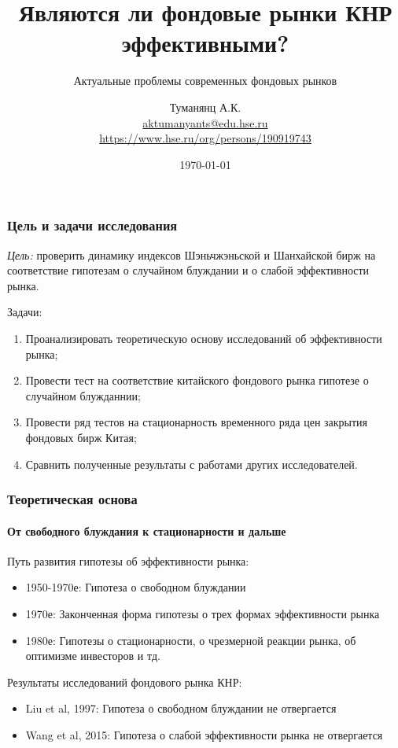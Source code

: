 \documentclass{beamer}
\title[Являются ли фондовые рынки КНР эффективными?]{Являются ли фондовые рынки КНР эффективными?}
\subtitle{Актуальные проблемы современных фондовых рынков}
\author[Туманянц А.К.]{Туманянц А.К. \\ \smallskip \scriptsize \url{aktumanyants@edu.hse.ru}\\\url{https://www.hse.ru/org/persons/190919743}}
\institute[Высшая школа экономики]{Национальный исследовательский университет \\ «Высшая школа экономики» (Москва)}
\date{\today}
\begin{document}

\frame[plain]{\titlepage}	%

\section{}
\subsection{}

\begin{frame}
\frametitle{Цель и задачи исследования}
\emph{Цель:} проверить динамику индексов Шэньчжэньской и Шанхайской бирж на соответствие гипотезам о случайном блуждании и о слабой эффективности рынка.

Задачи:
\begin{enumerate}
	\item Проанализировать теоретическую основу исследований об эффективности рынка;
  \item Провести тест на соответствие китайского фондового рынка гипотезе о случайном блужданнии;
  \item Провести ряд тестов на стационарность временного ряда цен закрытия фондовых бирж Китая;
  \item Сравнить полученные результаты с работами других исследователей.
\end{enumerate}
\end{frame}

\begin{frame}
\frametitle{Теоретическая основа}
\framesubtitle{От свободного блуждания к стационарности и дальше}
Путь развития гипотезы об эффективности рынка:
\begin{itemize}
	\item 1950-1970е: Гипотеза о свободном блуждании
	\item 1970е: Законченная форма гипотезы о трех формах эффективности рынка
	\item 1980е: Гипотезы о стационарности, о чрезмерной реакции рынка, об оптимизме инвесторов и тд.
\end{itemize}
Результаты исследований фондового рынка КНР:
\begin{itemize}
	\item Liu et al, 1997: Гипотеза о свободном блуждании не отвергается
	\item Wang et al, 2015: Гипотеза о слабой эффективности рынка не отвергается
\end{itemize}
\end{frame}
\end{document}
